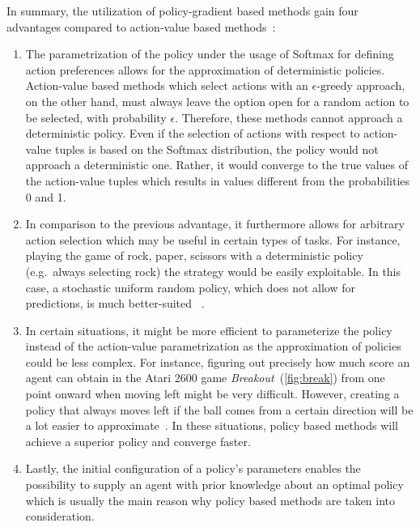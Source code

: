 \documentclass[draft,final]{vutinfth} %
\newcommand{\pautoref}[1]{(\autoref{#1})}
\newcommand{\p}[1]{see p. #1}
\begin{document}
    In summary, the utilization of policy-gradient based methods gain four advantages compared to action-value based methods~\citep[\p{322f}]{sutton_reinforcement_2018}:

    \begin{enumerate}
        \item The parametrization of the policy under the usage of Softmax for defining action preferences allows for the approximation of deterministic policies.
        Action-value based methods which select actions with an $\epsilon\text{-greedy}$ approach, on the other hand, must always leave the option open for a random action to be selected, with probability $\epsilon$.
        Therefore, these methods cannot approach a deterministic policy.
        Even if the selection of actions with respect to action-value tuples is based on the Softmax distribution, the policy would not approach a deterministic one.
        Rather, it would converge to the true values of the action-value tuples which results in values different from the probabilities 0 and 1.
        \item In comparison to the previous advantage, it furthermore allows for arbitrary action selection which may be useful in certain types of tasks.
        For instance, playing the game of rock, paper, scissors with a deterministic policy (e.g.\ always selecting rock) the strategy would be easily exploitable.
        In this case, a stochastic uniform random policy, which does not allow for predictions, is much better-suited ~.
        \item In certain situations, it might be more efficient to parameterize the policy instead of the action-value parametrization as the approximation of policies could be less complex.
        For instance, figuring out precisely how much score an agent can obtain in the Atari 2600 game \textit{Breakout}~\pautoref{fig:break} from one point onward when moving left might be very difficult.
        However, creating a policy that always moves left if the ball comes from a certain direction will be a lot easier to approximate~.
        In these situations, policy based methods will achieve a superior policy and converge faster\citep[\p{323}]{sutton_reinforcement_2018}.
        \item Lastly, the initial configuration of a policy's parameters enables the possibility to supply an agent with prior knowledge about an optimal policy which is usually the main reason why policy based methods are taken into consideration.
    \end{enumerate}
\end{document}
